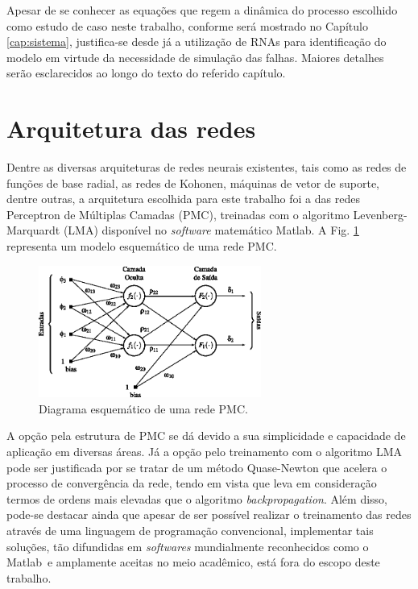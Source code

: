 Apesar de se conhecer as equações que regem a dinâmica do processo escolhido
como estudo de caso neste trabalho, conforme será mostrado no Capítulo
\ref{cap:sistema}, justifica-se desde já a utilização de RNAs para identificação
do modelo em virtude da necessidade de simulação das falhas. Maiores detalhes
serão esclarecidos ao longo do texto do referido capítulo.

\section{Arquitetura das redes}
Dentre as diversas arquiteturas de redes neurais existentes, tais como as redes
de funções de base radial, as redes de Kohonen, máquinas de vetor de suporte,
dentre outras, a arquitetura escolhida para este trabalho foi a das redes
Perceptron de Múltiplas Camadas (PMC), treinadas com o algoritmo
Levenberg-Marquardt (LMA) disponível no {\it software} matemático Matlab\reg. A
Fig. \ref{fig:pmc} representa um modelo esquemático de uma rede PMC.

\begin{figure}[htb]
\centering
    \includegraphics[width=0.65\textwidth]{imgs/rnas/eps/pmc}
    \caption{Diagrama esquemático de uma rede PMC.}
    \label{fig:pmc}
\end{figure}


A opção pela estrutura de PMC se dá devido a sua simplicidade e capacidade de
aplicação em diversas áreas. Já a opção pelo treinamento com o algoritmo LMA
pode ser justificada por se tratar de um método Quase-Newton que acelera o
processo de convergência da rede, tendo em vista que leva em consideração termos
de ordens mais elevadas que o algoritmo {\it backpropagation}. Além disso,
pode-se destacar ainda que apesar de ser possível realizar o treinamento das
redes através de uma linguagem de programação convencional, implementar tais
soluções, tão difundidas em {\it softwares} mundialmente reconhecidos como o
Matlab\reg\ e amplamente aceitas no meio acadêmico, está fora do escopo deste
trabalho.

